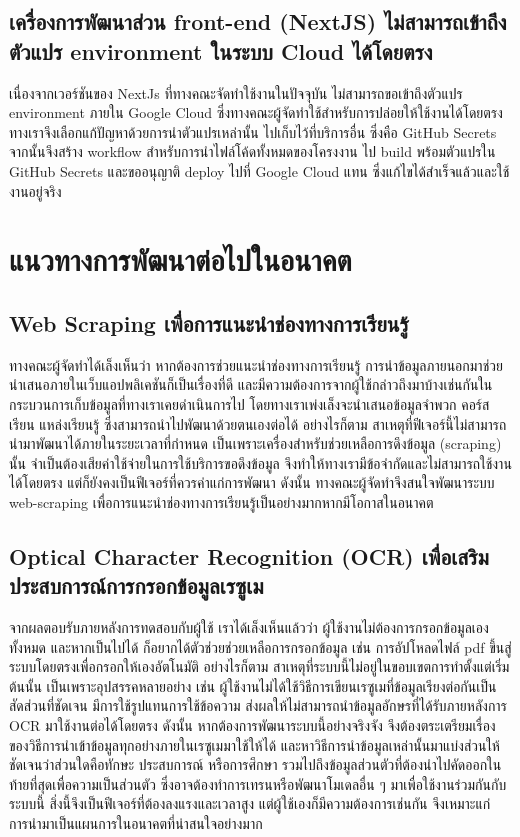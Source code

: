\subsection{เครื่องการพัฒนาส่วน front-end (NextJS) ไม่สามารถเข้าถึงตัวแปร environment ในระบบ Cloud ได้โดยตรง}
\par{
    เนื่องจากเวอร์ชันของ NextJs ที่ทางคณะจัดทำใช้งานในปัจจุบัน ไม่สามารถขอเข้าถึงตัวแปร environment ภายใน Google Cloud ซึ่งทางคณะผู้จัดทำใช้สำหรับการปล่อยให้ใช้งานได้โดยตรง
    ทางเราจึงเลือกแก้ปัญหาด้วยการนำตัวแปรเหล่านั้น ไปเก็บไว้ที่บริการอื่น ซึ่งคือ GitHub Secrets จากนั้นจึงสร้าง workflow สำหรับการนำไฟล์โค้ดทั้งหมดของโครงงาน
    ไป build พร้อมตัวแปรใน GitHub Secrets และขออนุญาติ deploy ไปที่ Google Cloud แทน ซึ่งแก้ไขได้สำเร็จแล้วและใช้งานอยู่จริง
}

\section{แนวทางการพัฒนาต่อไปในอนาคต}
\subsection{Web Scraping เพื่อการแนะนำช่องทางการเรียนรู้}
\par{
    ทางคณะผู้จัดทำได้เล็งเห็นว่า หากต้องการช่วยแนะนำช่องทางการเรียนรู้ การนำข้อมูลภายนอกมาช่วยนำเสนอภายในเว็บแอปพลิเคชันก็เป็นเรื่องที่ดี และมีความต้องการจากผู้ใช้กล่าวถึงมาบ้างเช่นกันในกระบวนการเก็บข้อมูลที่ทางเราเคยดำเนินการไป
    โดยทางเราเพ่งเล็งจะนำเสนอข้อมูลจำพวก คอร์สเรียน แหล่งเรียนรู้ ซึ่งสามารถนำไปพัฒนาด้วยตนเองต่อได้ อย่างไรก็ตาม สาเหตุที่ฟีเจอร์นี้ไม่สามารถนำมาพัฒนาได้ภายในระยะเวลาที่กำหนด
    เป็นเพราะเครื่องสำหรับช่วยเหลือการดึงข้อมูล (scraping) นั้น จำเป็นต้องเสียค่าใช้จ่ายในการใช้บริการขอดึงข้อมูล จึงทำให้ทางเรามีข้อจำกัดและไม่สามารถใช้งานได้โดยตรง แต่ก็ยังคงเป็นฟีเจอร์ที่ควรค่าแก่การพัฒนา ดังนั้น
    ทางคณะผู้จัดทำจึงสนใจพัฒนาระบบ web-scraping เพื่อการแนะนำช่องทางการเรียนรู้เป็นอย่างมากหากมีโอกาสในอนาคต
}
\subsection{Optical Character Recognition (OCR) เพื่อเสริมประสบการณ์การกรอกข้อมูลเรซูเม}
\par{
    จากผลตอบรับภายหลังการทดสอบกับผู้ใช้ เราได้เล็งเห็นแล้วว่า ผู้ใช้งานไม่ต้องการกรอกข้อมูลเองทั้งหมด และหากเป็นไปได้ ก็อยากได้ตัวช่วยช่วยเหลือการกรอกข้อมูล
    เช่น การอัปโหลดไฟล์ pdf ขึ้นสู่ระบบโดยตรงเพื่อกรอกให้เองอัตโนมัติ อย่างไรก็ตาม สาเหตุที่ระบบนี้ไม่อยู่ในขอบเขตการทำตั้งแต่เริ่มต้นนั้น เป็นเพราะอุปสรรคหลายอย่าง
    เช่น ผู้ใช้งานไม่ได้ใช้วิธีการเขียนเรซูเมที่ข้อมูลเรียงต่อกันเป็นสัดส่วนที่ชัดเจน มีการใช้รูปแทนการใช้ข้อความ ส่งผลให้ไม่สามารถนำข้อมูลอักษรที่ได้รับภายหลังการ OCR มาใช้งานต่อได้โดยตรง
    ดังนั้น หากต้องการพัฒนาระบบนี้อย่างจริงจัง จึงต้องตระเตรียมเรื่องของวิธีการนำเข้าข้อมูลทุกอย่างภายในเรซูเมมาใช้ให้ได้ และหาวิธีการนำข้อมูลเหล่านั้นมาแบ่งส่วนให้ชัดเจนว่าส่วนใดคือทักษะ ประสบการณ์ หรือการศึกษา รวมไปถึงข้อมูลส่วนตัวที่ต้องนำไปคัดออกในท้ายที่สุดเพื่อความเป็นส่วนตัว
    ซึ่งอาจต้องทำการเทรนหรือพัฒนาโมเดลอื่น ๆ มาเพื่อใช้งานร่วมกันกับระบบนี้ สิ่งนี้จึงเป็นฟีเจอร์ที่ต้องลงแรงและเวลาสูง แต่ผู้ใช้เองก็มีความต้องการเช่นกัน จึงเหมาะแก่การนำมาเป็นแผนการในอนาคตที่น่าสนใจอย่างมาก
}

